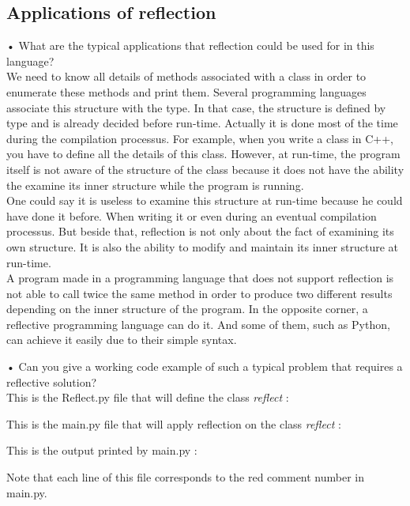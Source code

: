 \subsection{Applications of reflection}
•	What are the typical applications that reflection could be used for in this language?\\

We need to know all details of methods associated with a class in order to enumerate these methods and print them. Several programming languages associate this structure with the type. In that case, the structure is defined by type and is already decided before run-time. Actually it is done most of the time during the compilation processus. For example, when you write a class in C++, you have to define all the details of this class. However, at run-time, the program itself is not aware of the structure of the class because it does not have the ability the examine its inner structure while the program is running.\\
One could say it is useless to examine this structure at run-time because he could have done it before. When writing it or even during an eventual compilation processus. But beside that, reflection is not only about the fact of examining its own structure. It is also the ability to modify and maintain its inner structure at run-time.\\
A program made in a programming language that does not support reflection is not able to call twice the same method in order to produce two different results depending on the inner structure of the program. In the opposite corner, a reflective programming language can do it. And some of them, such as Python, can achieve it easily due to their simple syntax. \cite{assembleforce}
\newline


•	Can you give a working code example of such a typical problem that requires a reflective solution?\\

This is the Reflect.py file that will define the class \emph{reflect} :


This is the main.py file that will apply reflection on the class \emph{reflect} :


This is the output printed by main.py :

Note that each line of this file corresponds to the red comment number in main.py.\\

